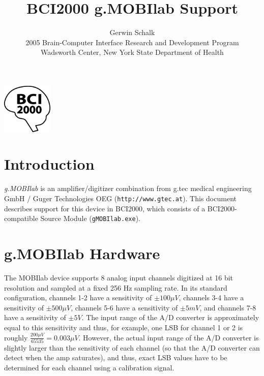 \documentclass[letterpaper, oneside, 12pt]{article}
\begin{document}
%
\title{BCI2000 g.MOBIlab Support}
\author{Gerwin Schalk\\ \small{2005 Brain-Computer Interface Research and Development Program}\\ \small{Wadsworth Center, New York State Department of Health}}
\maketitle
\centerline{\includegraphics[height=2.4cm,keepaspectratio=true]{BCI2000logo}}




\section{Introduction}

\sloppypar \emph{g.MOBIlab} is an amplifier/digitizer combination from g.tec 
medical engineering GmbH / Guger Technologies OEG (\texttt{http://www.gtec.at}). 
This document describes support for this device in BCI2000, which consists of a 
BCI2000-compatible Source Module (\texttt{gMOBIlab.exe}). 

\section{g.MOBIlab Hardware}

The MOBIlab device supports 8 analog input channels digitized at 16 bit 
resolution and sampled at a fixed 256 Hz sampling rate. In its standard 
configuration, channels 1-2 have a sensitivity of $\pm100\mu V$, channels 3-4 
have a sensitivity of $\pm500\mu V$, channels 5-6 have a sensitivity of 
$\pm5mV$, and channels 7-8 have a sensitivity of $\pm5V$. The input range of the 
A/D converter is approximately equal to this sensitivity and thus, for example, 
one LSB for channel 1 or 2 is roughly $\frac{200\mu V}{65535}=0.003\mu V$. However,
the actual input range of the A/D converter is slightly larger than the sensitivity
of each channel (so that the A/D converter can detect when the amp saturates), and
thus, exact LSB values have to be determined for each channel using a calibration signal.
\end{document}
